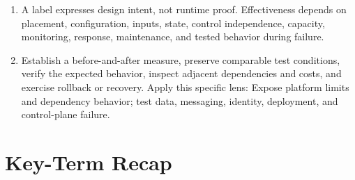 \documentclass[11pt]{article}
\begin{document}
\begin{enumerate}
\item A label expresses design intent, not runtime proof. Effectiveness depends on placement, configuration, inputs, state, control independence, capacity, monitoring, response, maintenance, and tested behavior during failure.
\item Establish a before-and-after measure, preserve comparable test conditions, verify the expected behavior, inspect adjacent dependencies and costs, and exercise rollback or recovery. Apply this specific lens: Expose platform limits and dependency behavior; test data, messaging, identity, deployment, and control-plane failure.
\end{enumerate}
\section{Key-Term Recap}
\end{document}
